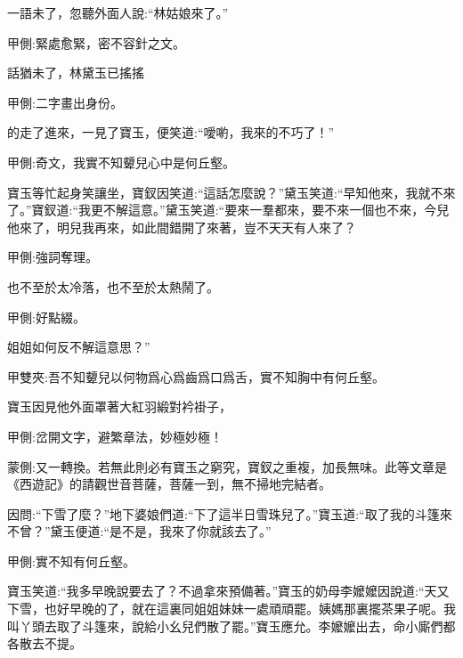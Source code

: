 \begin{parag}
    一語未了，忽聽外面人說:“林姑娘來了。”\begin{note}甲側:緊處愈緊，密不容針之文。\end{note}話猶未了，林黛玉已搖搖\begin{note}甲側:二字畫出身份。\end{note}的走了進來，一見了寶玉，便笑道:“噯喲，我來的不巧了！”\begin{note}甲側:奇文，我實不知顰兒心中是何丘壑。\end{note}寶玉等忙起身笑讓坐，寶釵因笑道:“這話怎麼說？”黛玉笑道:“早知他來，我就不來了。”寶釵道:“我更不解這意。”黛玉笑道:“要來一羣都來，要不來一個也不來，今兒他來了，明兒我再來，如此間錯開了來著，豈不天天有人來了？\begin{note}甲側:強詞奪理。\end{note}也不至於太冷落，也不至於太熱鬧了。\begin{note}甲側:好點綴。\end{note}姐姐如何反不解這意思？”\begin{note}甲雙夾:吾不知顰兒以何物爲心爲齒爲口爲舌，實不知胸中有何丘壑。\end{note}
\end{parag}


\begin{parag}
    寶玉因見他外面罩著大紅羽緞對衿褂子，\begin{note}甲側:岔開文字，避繁章法，妙極妙極！\end{note}\begin{note}蒙側:又一轉換。若無此則必有寶玉之窮究，寶釵之重複，加長無味。此等文章是《西遊記》的請觀世音菩薩，菩薩一到，無不掃地完結者。\end{note}因問:“下雪了麼？”地下婆娘們道:“下了這半日雪珠兒了。”寶玉道:“取了我的斗篷來不曾？”黛玉便道:“是不是，我來了你就該去了。”\begin{note}甲側:實不知有何丘壑。\end{note}寶玉笑道:“我多早晚說要去了？不過拿來預備著。”寶玉的奶母李嬤嬤因說道:“天又下雪，也好早晚的了，就在這裏同姐姐妹妹一處頑頑罷。姨媽那裏擺茶果子呢。我叫丫頭去取了斗篷來，說給小幺兒們散了罷。”寶玉應允。李嬤嬤出去，命小廝們都各散去不提。
\end{parag}


